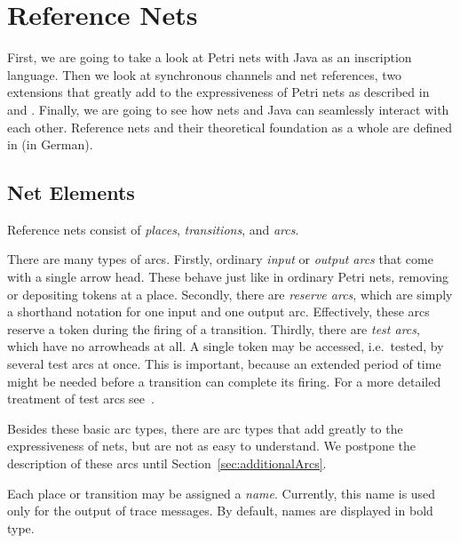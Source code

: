 \chapter{Reference Nets}
\label{ch:reference}

First, we are going to take a look at Petri nets with Java as an
inscription language. Then we look at synchronous channels
and net references, two extensions that greatly add
to the expressiveness of Petri nets as described in~\cite{Kummer98}
and \cite{Kummer99}.
Finally, we are going to see how nets and Java can
seamlessly interact with each other.
Reference nets and their theoretical foundation as a whole are
defined in \cite{Kummer2002:diss} (in German).

\section{Net Elements}

Reference nets consist of \emph{places}, \emph{transitions}, and
\emph{arcs}.

There are many types of arcs. Firstly, ordinary
\emph{input} or \emph{output arcs} that come with a single arrow head.
These behave just like in ordinary Petri nets, removing or depositing
tokens at a place. Secondly, there are \emph{reserve arcs}, which are simply
a shorthand notation for one input and one output arc. Effectively, these
arcs reserve a token during the firing of a transition. Thirdly, there
are \emph{test arcs}, which have no arrowheads at all. A single token may be
accessed, i.e.\ tested, by several test arcs at once. This is
important, because an extended period of time might be needed before
a transition can complete its firing. For a more detailed treatment
of test arcs see~\cite{CDH93}.

Besides these basic arc types, there are arc types that add
greatly to the expressiveness of nets, but are not as easy
to understand. We postpone the description of these arcs until
Section~\ref{sec:additionalArcs}.

Each place or transition may be assigned a \emph{name}. Currently,
this name is used only for the output of trace messages.
By default, names are displayed in bold type.


